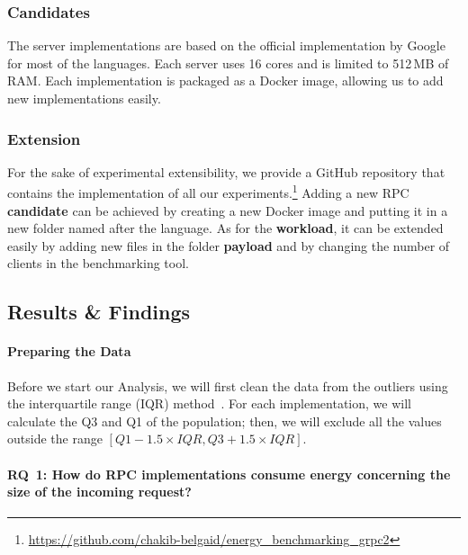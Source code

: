 \subsubsection*{Candidates}
The server implementations are based on the official implementation by Google for most of the languages.
Each server uses 16 cores and is limited to 512\,MB of RAM.
Each implementation is packaged as a Docker image, allowing us to add new implementations easily.

\subsubsection{Extension}
For the sake of experimental extensibility, we provide a GitHub repository that contains the implementation of all our experiments.\footnote{\url{https://github.com/chakib-belgaid/energy_benchmarking_grpc2}}
Adding a new RPC \textbf{candidate} can be achieved by creating a new Docker image and putting it in a new folder named after the language.
As for the \textbf{workload}, it can be extended easily by adding new files in the folder \textbf{payload} and by changing the number of clients in the benchmarking tool.


\subsection{Results \& Findings}
\paragraph{Preparing the Data}
Before we start our Analysis, we will first clean the data from the outliers using the interquartile range (IQR) method~\cite{leys2013detecting}.
For each implementation, we will calculate the Q3 and Q1 of the population; then, we will exclude all the values outside the range
$ [Q1 - 1.5 \times IQR, Q3 + 1.5 \times IQR ]$.

\paragraph{\textsc{RQ}~1: How do RPC implementations consume energy concerning the size of the incoming request?}


